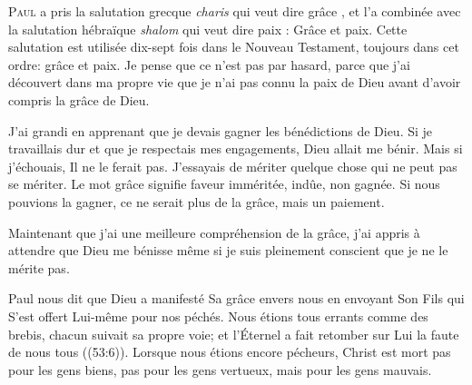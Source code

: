 \dvrule







\lettrine{P}{aul} a pris la salutation grecque \emph{charis}
 qui veut dire \Og grâce \Fg{}, et l'a combinée avec la salutation
 hébraïque \emph{shalom} qui veut dire \Og paix \Fg{}: 
 \Og Grâce et paix. \Fg{}
 Cette salutation est utilisée dix-sept fois dans le Nouveau Testament,
 toujours dans cet ordre:  \Og grâce et paix. \Fg{}
 Je pense que ce n'est pas par hasard, parce que j'ai découvert
 dans ma propre vie que je n'ai pas connu la paix de Dieu
 avant d'avoir compris la grâce de Dieu.

J'ai grandi en apprenant que je devais gagner les bénédictions de Dieu.
 Si je travaillais dur et que je respectais mes engagements,
 Dieu allait me bénir. Mais si j'échouais, Il ne le ferait pas.
 J'essayais de mériter quelque chose qui ne peut pas se mériter.
 Le mot \Og grâce \Fg{} signifie \Og faveur imméritée, indûe,
 non gagnée. \Fg{} Si nous pouvions la gagner,
 ce ne serait plus de la grâce, mais un paiement.


Maintenant que j'ai une meilleure compréhension de la grâce,
 j'ai appris à attendre que Dieu me bénisse même si je suis pleinement
 conscient que je ne le mérite pas.

Paul nous dit que Dieu a manifesté Sa grâce envers nous en envoyant Son Fils
 qui S'est offert Lui-même pour nos péchés.
 \Og Nous étions tous errants comme des brebis, chacun suivait sa propre voie;
 et l'Éternel a fait retomber sur Lui la faute de nous tous \Fg{}
 ((53:6)).
 Lorsque nous étions encore pécheurs, Christ est mort
 \ocadr pas pour les gens biens, pas pour les gens vertueux,
 mais pour les gens mauvais.

